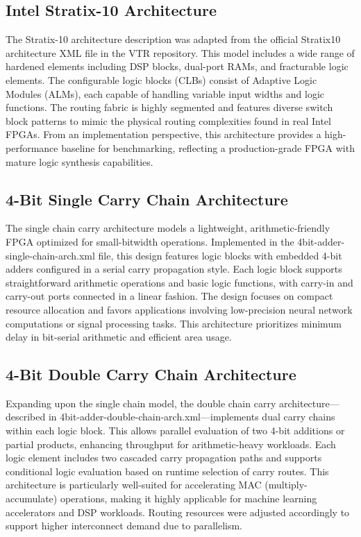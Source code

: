 \subsection{Intel Stratix-10 Architecture}
The Stratix-10 architecture description was adapted from the official Stratix10 architecture XML file in the VTR repository. This model includes a wide range of hardened elements including DSP blocks, dual-port RAMs, and fracturable logic elements. The configurable logic blocks (CLBs) consist of Adaptive Logic Modules (ALMs), each capable of handling variable input widths and logic functions. The routing fabric is highly segmented and features diverse switch block patterns to mimic the physical routing complexities found in real Intel FPGAs. From an implementation perspective, this architecture provides a high-performance baseline for benchmarking, reflecting a production-grade FPGA with mature logic synthesis capabilities.

\subsection{4-Bit Single Carry Chain Architecture}
The single chain carry architecture models a lightweight, arithmetic-friendly FPGA optimized for small-bitwidth operations. Implemented in the 4bit-adder-single-chain-arch.xml file, this design features logic blocks with embedded 4-bit adders configured in a serial carry propagation style. Each logic block supports straightforward arithmetic operations and basic logic functions, with carry-in and carry-out ports connected in a linear fashion. The design focuses on compact resource allocation and favors applications involving low-precision neural network computations or signal processing tasks. This architecture prioritizes minimum delay in bit-serial arithmetic and efficient area usage.

\subsection{4-Bit Double Carry Chain Architecture}
Expanding upon the single chain model, the double chain carry architecture—described in 4bit-adder-double-chain-arch.xml—implements dual carry chains within each logic block. This allows parallel evaluation of two 4-bit additions or partial products, enhancing throughput for arithmetic-heavy workloads. Each logic element includes two cascaded carry propagation paths and supports conditional logic evaluation based on runtime selection of carry routes. This architecture is particularly well-suited for accelerating MAC (multiply-accumulate) operations, making it highly applicable for machine learning accelerators and DSP workloads. Routing resources were adjusted accordingly to support higher interconnect demand due to parallelism.

